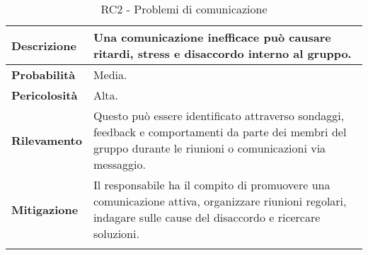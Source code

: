 \begin{longtable}{ | l | p{12cm} | }
    \hline
    \textbf{Descrizione} & Una comunicazione inefficace può causare ritardi, stress e disaccordo interno al gruppo. \\
    \hline
    \textbf{Probabilità} & Media. \\
    \hline
    \textbf{Pericolosità} & Alta. \\
    \hline
    \textbf{Rilevamento} & Questo può essere identificato attraverso sondaggi, feedback e comportamenti da parte dei membri del gruppo durante le riunioni o comunicazioni via messaggio. \\
    \hline
    \textbf{Mitigazione} & Il responsabile ha il compito di promuovere una comunicazione attiva, organizzare riunioni regolari, indagare sulle cause del disaccordo e ricercare soluzioni. \\
    \hline
    \caption{RC2 - Problemi di comunicazione}
    \label{table:9}
\end{longtable}